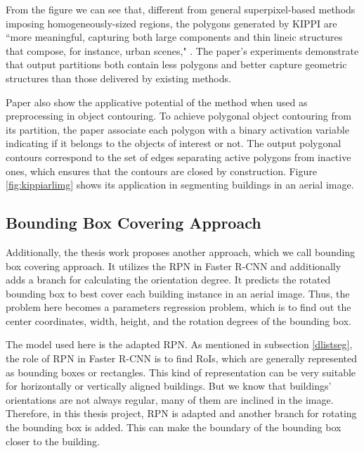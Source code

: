 

From the figure we can see that, different from general superpixel-based methods imposing homogeneously-sized regions, the polygons generated by KIPPI are ``more meaningful, capturing both large components and thin lineic structures that compose, for instance, urban scenes," \cite{kippi}. The paper's experiments demonstrate that output partitions both contain less polygons and better capture geometric structures than those delivered by existing methods.



Paper \cite{kippi} also show the applicative potential of the method when used as preprocessing in object contouring. To achieve polygonal object contouring from its partition, the paper associate each polygon with a binary activation variable indicating if it belongs to the objects of interest or not. The output polygonal contours correspond to the set of edges separating active polygons from inactive ones, which ensures that the contours are closed by construction. Figure \ref{fig:kippiarlimg} shows its application in segmenting buildings in an aerial image.

\subsection{Bounding Box Covering Approach}\label{bboxapp}
Additionally, the thesis work \cite{msnadine} proposes another approach, which we call bounding box covering approach. It utilizes the RPN in Faster R-CNN \cite{fasterrcnn} and additionally adds a branch for calculating the orientation degree. It predicts the rotated bounding box to best cover each building instance in an aerial image. Thus, the problem here becomes a parameters regression problem, which is to find out the center coordinates, width, height, and the rotation degrees of the bounding box. 

The model used here is the adapted RPN. As mentioned in subsection \ref{dlistseg}, the role of RPN in Faster R-CNN is to find RoIs, which are generally represented as bounding boxes or rectangles. This kind of representation can be very suitable for horizontally or vertically aligned buildings. But we know that buildings' orientations are not always regular, many of them are inclined in the image. Therefore, in this thesis project, RPN is adapted and another branch for rotating the bounding box is added. This can make the boundary of the bounding box closer to the building.

